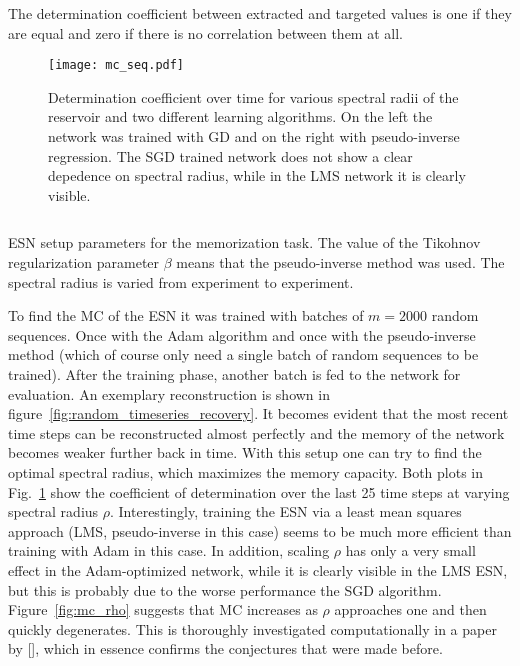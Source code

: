 The determination coefficient between extracted and targeted values is one if
they are equal and zero if there is no correlation between them at all.
\begin{figure}
  \texttt{[image: mc\_seq.pdf]}
  \caption{Determination coefficient over time for various spectral radii of
  the reservoir and two different learning algorithms. On the left the network
  was trained with GD and on the right with pseudo-inverse regression. The SGD
  trained network does not show a clear depedence on spectral radius, while in
  the LMS network it is clearly visible.}
  \label{fig:mc_seq}
\end{figure}

\begin{listing}
  \inputminted{json}{pseudocode/model_setups/memorize_setup.json}
  \label{lst:memorize_setup}
  \caption{ESN setup parameters for the memorization task. The 
    value of the Tikohnov regularization parameter $\beta$ means that the
    pseudo-inverse method was used. The spectral radius is varied from experiment
    to experiment.
  }
\end{listing}

To find the MC of the ESN it was trained with batches of $m=2000$ random
sequences.  Once with the Adam algorithm and once with the pseudo-inverse
method (which of course only need a single batch of random sequences to be
trained). After the training phase, another batch is fed to the network for
evaluation. An exemplary reconstruction is shown in
figure~\ref{fig:random_timeseries_recovery}.  It becomes evident that the most
recent time steps can be reconstructed almost perfectly and the memory of the
network becomes weaker further back in time.  With this setup one can try to
find the optimal spectral radius, which maximizes the memory capacity.  Both
plots in Fig.~\ref{fig:mc_seq} show the coefficient of determination over the
last 25 time steps at varying spectral radius $\rho$.  Interestingly, training
the ESN via a least mean squares approach (LMS, pseudo-inverse in this case)
seems to be much more efficient than training with Adam in this case.  In
addition, scaling $\rho$ has only a very small effect in the Adam-optimized
network, while it is clearly visible in the LMS ESN, but this is probably due
to the worse performance the SGD algorithm.  Figure~\ref{fig:mc_rho} suggests
that MC increases as $\rho$ approaches one and then quickly degenerates. This
is thoroughly investigated computationally in a paper by [\cite{farkavs2016}],
which in essence confirms the conjectures that were made before.

